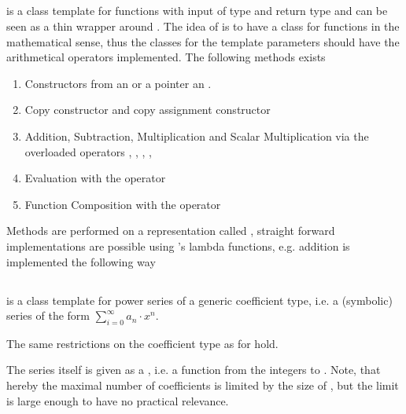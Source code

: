 		\subsection{\func}
			\textbf{} is a class template for functions with input 
			of type  and return type  and can be seen as a thin wrapper around .
			The idea of \func is to have a class for functions in the mathematical sense, thus the classes for the template
			parameters should have the arithmetical operators implemented.
			The following methods exists
			\begin{enumerate}
				\item Constructors from an  or a pointer an .
				\item  Copy constructor  and copy assignment constructor 
				\item Addition, Subtraction, Multiplication and Scalar Multiplication via the overloaded operators \code{+}, \code{-}, 	\code{*}, \code{+=}, \code{*=}
				\item Evaluation with the operator \code{()}
				\item Function Composition with the operator \code{()}
			\end{enumerate}
			Methods are performed on a representation called , straight forward implementations
			are possible using {\ccx}'s lambda functions, e.g. addition is implemented the following way
			
		\subsection{\powerseries}
			\textbf{} is a class template for power series of a generic coefficient type, 
			i.e. a (symbolic) series of the form $ \sum_{i=0}^\infty a_n \cdot x^n$.

			The same restrictions on the coefficient type as for \poly hold.
			
			The series itself is given as a , i.e. a function from the integers to . Note, that hereby the maximal number of coefficients is limited by the size of , 
			but the limit is large enough to have no practical relevance.   

